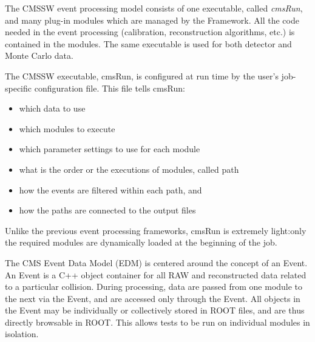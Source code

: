 The CMSSW event processing model consists of one executable, called \textit{cmsRun}, and many plug-in modules which are managed by the Framework. All the code needed in the event processing (calibration, reconstruction algorithms, etc.) is contained in the modules. The same executable is used for both detector and Monte Carlo data.

The CMSSW executable, cmsRun, is configured at run time by the user's job-specific configuration file. This file tells cmsRun:

\begin{itemize}
\item 
which data to use
\item 
which modules to execute
\item
which parameter settings to use for each module
\item
what is the order or the executions of modules, called path
\item
how the events are filtered within each path, and
\item
how the paths are connected to the output files 
\end{itemize}

Unlike the previous event processing frameworks, cmsRun is extremely light:only the required modules are dynamically loaded at the beginning of the job.

The CMS Event Data Model (EDM) is centered around the concept of an Event. An Event is a C++ object container for all RAW and reconstructed data related to a particular collision. During processing, data are passed from one module to the next via the Event, and are accessed only through the Event. All objects in the Event may be individually or collectively stored in ROOT files, and are thus directly browsable in ROOT. This allows tests to be run on individual modules in isolation. 